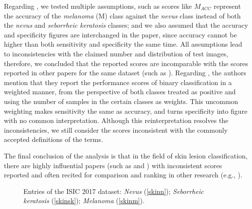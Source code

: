 \documentclass[5p, final]{elsarticle}
\begin{document}
Regarding \cite{skin7}, we tested multiple assumptions, such as scores like $M_{ACC}$ represent the accuracy of the \emph{melanoma} (M) class against the \emph{nevus} class instead of both the \emph{nevus} and \emph{seborrheic keratosis} classes; and we also assumed that the accuracy and specificity figures are interchanged in the paper, since accuracy cannot be higher than both sensitivity and specificity the same time. All assumptions lead to inconsistencies with the claimed number and distribution of test images, therefore, we concluded that the reported scores are incomparable with the scores reported in other papers for the same dataset (such as \cite{skin3}). Regarding \cite{skin9}, the authors mention that they report the performance scores of binary classification in a weighted manner, from the perspective of both classes treated as positive and using the number of samples in the certain classes as weights. This uncommon weighting makes sensitivity the same as accuracy, and turns specificity into figure with no common interpretation. Although this reinterpretation resolves the inconsistencies, we still consider the scores inconsistent with the commonly accepted definitions of the terms.

The final conclusion of the analysis is that in the field of skin lesion classification, there are highly influential papers (such as \cite{skin7} and \cite{skin9}) with inconsistent scores reported and often recited for comparison and ranking in other research (e.g., \cite{skin7ref}).

\begin{figure}[t]
\begin{center}
\end{center}
\caption{Entries of the ISIC 2017 \cite{isic2017} dataset: \emph{Nevus} (\ref{skinn}); \emph{Seborrheic keratosis} (\ref{skinsk}); \emph{Melanoma} (\ref{skinm}).}
\label{figskin}
\end{figure}
\end{document}
